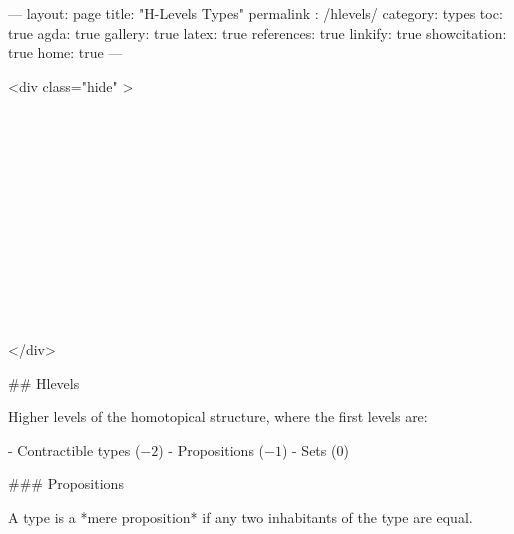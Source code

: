 ---
layout: page
title: "H-Levels Types"
permalink : /hlevels/
category: types
toc: true
agda: true
gallery: true
latex: true
references: true
linkify: true
showcitation: true
home: true
---

<div class="hide" >
\begin{code}%
\>[0]\AgdaSymbol{\{-\#}\AgdaSpace{}%
\AgdaSpace{}%
\AgdaSpace{}%
\AgdaSymbol{\#-\}}\<%
\\
\>[0]\AgdaSpace{}%
\AgdaModule{\AgdaUnderscore{}}\AgdaSpace{}%
\<%
\\
%
\\[\AgdaEmptyExtraSkip]%
\>[0]\AgdaSpace{}%
\AgdaSpace{}%
\<%
\\
\>[0]\AgdaSpace{}%
\AgdaSpace{}%
\<%
\\
%
\\[\AgdaEmptyExtraSkip]%
\>[0]\AgdaSpace{}%
\AgdaSpace{}%
\<%
\\
\>[0]\AgdaSpace{}%
\AgdaSpace{}%
\<%
\\
%
\\[\AgdaEmptyExtraSkip]%
\>[0]\AgdaSpace{}%
\AgdaSpace{}%
\<%
\\
\>[0]\AgdaSpace{}%
\AgdaSpace{}%
\<%
\\
\>[0]\AgdaSpace{}%
\AgdaSpace{}%
\<%
\end{code}
</div>


## Hlevels

Higher levels of the homotopical structure, where the
first levels are:

- Contractible types ($-2$)
- Propositions ($-1$)
- Sets ($0$)

### Propositions

\begin{code}%
\>[0]\AgdaSpace{}%
\AgdaSpace{}%
\<%
\end{code}

A type is a *mere proposition* if any two inhabitants of the type are equal.

